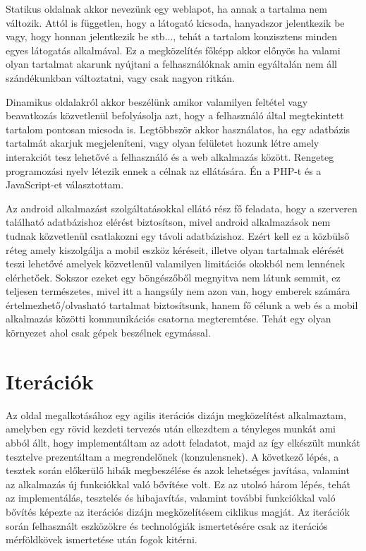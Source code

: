 \documentclass[12pt]{report}
\theoremstyle{definition}
\begin{document}
	Statikus oldalnak akkor nevezünk egy weblapot, ha annak a tartalma nem változik. Attól is független, hogy a látogató kicsoda, hanyadszor jelentkezik be vagy, hogy honnan jelentkezik be stb..., tehát a tartalom konzisztens minden egyes látogatás alkalmával. Ez a megközelítés főképp akkor előnyös ha valami olyan tartalmat akarunk nyújtani a felhasználóknak amin egyáltalán nem áll szándékunkban változtatni, vagy csak nagyon ritkán.
	
	Dinamikus oldalakról akkor beszélünk amikor valamilyen feltétel vagy beavatkozás közvetlenül befolyásolja azt, hogy a felhasználó által megtekintett tartalom pontosan micsoda is. Legtöbbször akkor használatos, ha egy adatbázis tartalmát akarjuk megjeleníteni, vagy olyan felületet hozunk létre amely interakciót tesz lehetővé a felhasználó és a web alkalmazás között. Rengeteg programozási nyelv létezik ennek a célnak az ellátására. Én a PHP-t és a JavaScript-et választottam.
	
	Az android alkalmazást szolgáltatásokkal ellátó rész fő feladata, hogy a szerveren található adatbázishoz elérést biztosítson, mivel android alkalmazások nem tudnak közvetlenül csatlakozni egy távoli adatbázishoz. Ezért kell ez a közbülső réteg amely kiszolgálja a mobil eszköz kéréseit, illetve olyan tartalmak elérését teszi lehetővé amelyek közvetlenül valamilyen limitációs okokból nem lennének elérhetőek. Sokszor ezeket egy böngészőből megnyitva nem látunk semmit, ez teljesen természetes, mivel itt a hangsúly nem azon van, hogy emberek számára értelmezhető/olvasható tartalmat biztosítsunk, hanem fő célunk a web és a mobil alkalmazás közötti kommunikációs csatorna megteremtése. Tehát egy olyan környezet ahol csak gépek beszélnek egymással.
	
	\section{Iterációk}
	
	Az oldal megalkotásához egy agilis iterációs dizájn megközelítést alkalmaztam, amelyben egy rövid kezdeti tervezés után elkezdtem a tényleges munkát ami abból állt, hogy implementáltam az adott feladatot, majd az így elkészült munkát tesztelve prezentáltam a megrendelőnek (konzulensnek). A következő lépés, a tesztek során előkerülő hibák megbeszélése és azok lehetséges javítása, valamint az alkalmazás új funkciókkal való bővítése volt. Ez az utolsó három lépés, tehát az implementálás, tesztelés és hibajavítás, valamint további funkciókkal való bővítés képezte az iterációs dizájn megközelítésem ciklikus magját. Az iterációk során felhasznált eszközökre és technológiák ismertetésére csak az iterációs mérföldkövek ismertetése után fogok kitérni. 
	
\end{document}
